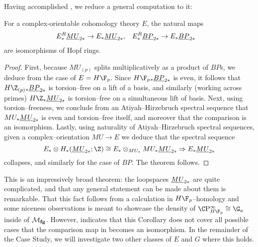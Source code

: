 Having accomplished , we reduce a general computation to it:

\begin{corollary}\label{HopfRingForEBP}
For a complex-orientable cohomology theory $E$, the natural maps
\begin{align*}
E_*^R \underline{\smash{MU}}_{2*} & \to E_* \underline{\smash{MU}}_{2*}, &
E_*^R \underline{\smash{BP}}_{2*} & \to E_* \underline{\smash{BP}}_{2*}
\end{align*}
are isomorphisms of Hopf rings.
\end{corollary}
\begin{proof}
First, because $MU_{(p)}$ splits multiplicatively as a product of $BP$s, we deduce from  the case of $E = H\F_p$.  Since $H\F_p{}_* \OS{BP}{2*}$ is even, it follows that $H\Z_{(p)}{}_* \OS{BP}{2*}$ is torsion--free on a lift of a basis, and similarly (working across primes) $H\Z_* \OS{MU}{2*}$  is torsion--free on a simultaneous lift of basis.  Next, using torsion--freeness, we conclude from an Atiyah--Hirzebruch spectral sequence that $MU_* \underline{\smash{MU}}_{2*}$ is even and torsion--free itself, and moreover that the comparison is an isomorphism.  Lastly, using naturality of Atiyah--Hirzebruch spectral sequences, given a complex--orientation $MU \to E$ we deduce that the spectral sequence \[E_* \otimes H_*(\OS{MU}{2*}; \Z) \cong E_* \otimes_{MU_*} MU_* \OS{MU}{2*} \Rightarrow E_* \OS{MU}{2*}\] collapses, and similarly for the case of $BP$.  The theorem follows.
\end{proof}

This is an impressively broad theorem: the loopspaces $\underline{\smash{MU}}_{2*}$ are quite complicated, and that any general statement can be made about them is remarkable.  That this fact follows from a calculation in $H\F_p$--homology and some niceness observations is meant to showcase the density of $\CP^\infty_{H\F_p} \cong \G_a$ inside of $\mathcal{M}_{\mathbf{fg}}$.  However,  indicates that this Corollary does not cover all possible cases that the comparison map in  becomes an isomorphism.  In the remainder of the Case Study, we will investigate two other classes of $E$ and $G$ where this holds.









